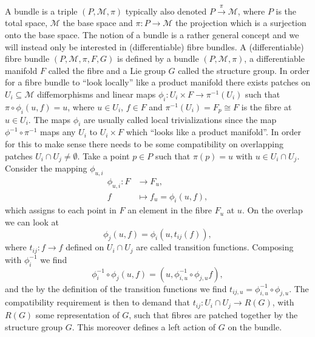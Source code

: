 A bundle is a triple $(P,\mathcal{M},\pi)$ typically also denoted $P\overset{\pi}{\longrightarrow}\mathcal{M}$, where $P$ is the total space, $\mathcal{M}$ the base space and $\pi: P\to \mathcal{M}$ the projection which is a surjection onto the base space. The notion of a bundle is a rather general concept and we will instead only be interested in (differentiable) fibre bundles. A (differentiable) fibre bundle $(P,\mathcal{M},\pi,F,G)$ is defined by a bundle $(P,\mathcal{M},\pi)$, a differentiable manifold $F$ called the fibre and a Lie group $G$ called the structure group. In order for a fibre bundle to ``look locally'' like a product manifold there exists patches on $U_i\subseteq \mathcal{M}$ diffemorphisms and linear maps $\phi_i: U_i\times F\to \pi^{-1}(U_i)$ such that $\pi\circ \phi_i(u,f)=u$, where $u\in U_i$, $f\in F$ and $\pi^{-1}(U_i)=F_p\cong F$ is the fibre at $u\in U_i$. The maps $\phi_i$ are usually called local trivializations since the map $\phi^{-1}\circ \pi^{-1}$ maps any $U_i$ to $U_i\times F$ which ``looks like a product manifold''. In order for this to make sense there needs to be some compatibility on overlapping patches $U_i\cap U_j\neq \emptyset$. Take a point $p\in P$ such that $\pi(p)=u$ with $u\in U_i\cap U_j$. Consider the mapping $\phi_{u,i}$
\begin{equation}
    \begin{aligned}
        \phi_{u,i}: F&\to F_u,\\
            f&\mapsto f_u = \phi_i(u,f),
    \end{aligned}
\end{equation}
which assigns to each point in $F$ an element in the fibre $F_u$ at $u$. On the overlap we can look at 
\begin{equation}
    \phi_{j}(u,f) = \phi_{i}(u,t_{ij}(f)),
\end{equation}
where $t_{ij}:f\to f$ defined on $U_i\cap U_j$ are called transition functions. Composing with $\phi_i^{-1}$ we find 
\begin{equation}
    \phi_{i}^{-1}\circ\phi_j (u,f) = (u,\phi^{-1}_{i,u}\circ \phi_{j,u}f),
\end{equation}
and the by the definition of the transition functions we find $t_{ij,u}=\phi^{-1}_{i,u}\circ \phi_{j,u}$. The compatibility requirement is then to demand that $t_{ij}: U_i\cap U_j\to R(G)$, with $R(G)$ some representation of $G$, such that fibres are patched together by the structure group $G$. This moreover defines a left action of $G$ on the bundle.

